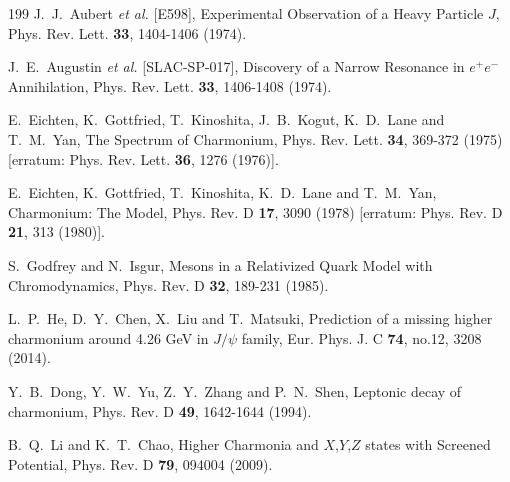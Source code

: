 \documentclass[prl,twocolumn,floatfix,amsmath,nofootinbib,amssymb,floatfix]{revtex4}
\begin{document}
\begin{thebibliography}{199}
J.~J.~Aubert \textit{et al.} [E598],
Experimental Observation of a Heavy Particle $J$,
Phys. Rev. Lett. \textbf{33}, 1404-1406 (1974).

J.~E.~Augustin \textit{et al.} [SLAC-SP-017],
Discovery of a Narrow Resonance in $e^+ e^-$ Annihilation,
Phys. Rev. Lett. \textbf{33}, 1406-1408 (1974).


E.~Eichten, K.~Gottfried, T.~Kinoshita, J.~B.~Kogut, K.~D.~Lane and T.~M.~Yan,
The Spectrum of Charmonium,
Phys. Rev. Lett. \textbf{34}, 369-372 (1975)
[erratum: Phys. Rev. Lett. \textbf{36}, 1276 (1976)].


E.~Eichten, K.~Gottfried, T.~Kinoshita, K.~D.~Lane and T.~M.~Yan,
Charmonium: The Model,
Phys. Rev. D \textbf{17}, 3090 (1978)
[erratum: Phys. Rev. D \textbf{21}, 313 (1980)].


S.~Godfrey and N.~Isgur,
Mesons in a Relativized Quark Model with Chromodynamics,
Phys. Rev. D \textbf{32}, 189-231 (1985).

L.~P.~He, D.~Y.~Chen, X.~Liu and T.~Matsuki,
Prediction of a missing higher charmonium around 4.26 GeV in $J/\psi$ family,
Eur. Phys. J. C \textbf{74}, no.12, 3208 (2014).


Y.~B.~Dong, Y.~W.~Yu, Z.~Y.~Zhang and P.~N.~Shen,
Leptonic decay of charmonium,
Phys. Rev. D \textbf{49}, 1642-1644 (1994).

B.~Q.~Li and K.~T.~Chao,
Higher Charmonia and $X$,$Y$,$Z$ states with Screened Potential,
Phys. Rev. D \textbf{79}, 094004 (2009).



\end{thebibliography}
\end{document}
